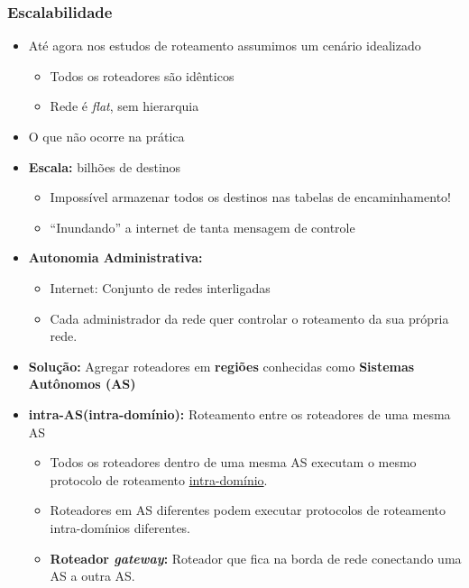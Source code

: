         \subsubsection*{Escalabilidade}
        \begin{itemize}[left=0.5cm, align=left, nosep]
            \item Até agora nos estudos de roteamento assumimos um cenário idealizado
            \begin{itemize}[left=0.5cm, nosep, label=$\hookrightarrow$]
                \item Todos os roteadores são idênticos
                \item Rede é \textit{flat}, sem hierarquia
            \end{itemize}
            \item O que não ocorre na prática 
            
            \item \textbf{Escala:} bilhões de destinos
            \begin{itemize}[left=0.5cm, nosep, label=$\hookrightarrow$]
                \item Impossível armazenar todos os destinos nas tabelas de encaminhamento!
                \item ``Inundando'' a internet de tanta mensagem de controle
            \end{itemize}
            \item \textbf{Autonomia Administrativa:} 
            \begin{itemize}[left=0.5cm, nosep, label=$\hookrightarrow$]
                \item Internet: Conjunto de redes interligadas
                \item Cada administrador da rede quer controlar o roteamento da sua própria rede.
            \end{itemize}

            \item \textbf{Solução:} Agregar roteadores em \textbf{regiões} conhecidas como \textbf{Sistemas Autônomos (AS)}
            
            \item \textbf{intra-AS(intra-domínio):} Roteamento entre os roteadores de uma mesma AS    
            \begin{itemize}[left=0.5cm, nosep, label=$\hookrightarrow$]
                \item Todos os roteadores dentro de uma mesma AS executam o mesmo protocolo de roteamento \underline{intra-domínio}.
                \item Roteadores em AS diferentes podem executar protocolos de roteamento intra-domínios diferentes.
                \item \textbf{Roteador \textit{gateway}:} Roteador que fica na borda de rede conectando uma AS a outra AS.
            \end{itemize}
            

\end{itemize}
